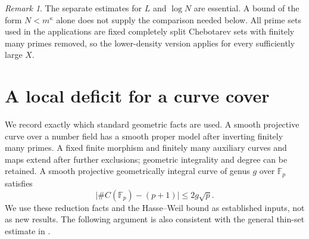 \documentclass[11pt,a4paper]{article}
\theoremstyle{definition}
\theoremstyle{remark}
\newtheorem{remark}[theorem]{Remark}
\newcommand{\F}{\mathbb F}
\begin{document}
\begin{remark}
The separate estimates for $L$ and $\log N$ are essential. A bound of the
form $N<m^\kappa$ alone does not supply the comparison needed below.
All prime sets used in the applications are fixed completely split
Chebotarev sets with finitely many primes removed, so the lower-density
version applies for every sufficiently large $X$.
\end{remark}

\section{A local deficit for a curve cover}

We record exactly which standard geometric facts are used. A smooth
projective curve over a number field has a smooth proper model after
inverting finitely many primes. A fixed finite morphism and finitely
many auxiliary curves and maps extend after further exclusions;
geometric integrality and degree can be retained. A smooth projective
geometrically integral curve of genus $g$ over $\F_p$ satisfies
\begin{equation}\label{eq:Weil}
 \bigl|\#C(\F_p)-(p+1)\bigr|\le2g\sqrt p.
\end{equation}
We use these reduction facts and the Hasse--Weil bound as established
inputs, not as new results. The following argument is also consistent
with the general thin-set estimate in \cite[Lemma~3.8(2)]{BL}.
\end{document}
